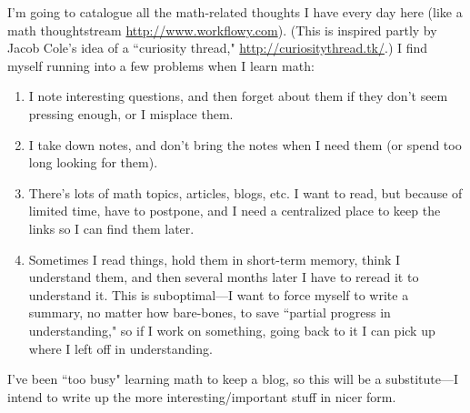 I'm going to catalogue all the math-related thoughts I have every day here (like a math thoughtstream \url{http://www.workflowy.com}). (This is inspired partly by Jacob Cole's idea of a ``curiosity thread," \url{http://curiositythread.tk/}.) I find myself running into a few problems when I learn math:
\begin{enumerate}
\item
I note interesting questions, and then forget about them if they don't seem pressing enough, or I misplace them.
\item
I take down notes, and don't bring the notes when I need them (or spend too long looking for them). 
\item There's lots of math topics, articles, blogs, etc. I want to read, but because of limited time, have to postpone, and I need a centralized place to keep the links so I can find them later.
\item
Sometimes I read things, hold them in short-term memory, think I understand them, and then several months later I have to reread it to understand it. This is suboptimal---I want to force myself to write a summary, no matter how bare-bones, to save ``partial progress in understanding," so if I work on something, going back to it I can pick up where I left off in understanding.
\end{enumerate}
I've been ``too busy" learning math to keep a blog, so this will be a substitute---I intend to write up the more interesting/important stuff in nicer form.



